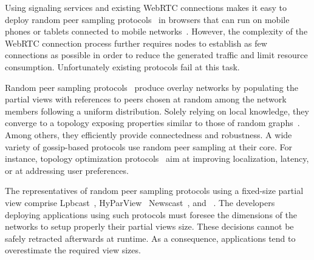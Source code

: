 
Using signaling services and existing WebRTC connections makes it easy
to deploy random peer sampling protocols~\cite{jelasity2004peer} in
browsers that can run on mobile phones or tablets connected to mobile
networks~\cite{Carvajal-Gómez2015}. However, the complexity of the
WebRTC connection process further requires nodes to establish as few
connections as possible in order to reduce the generated traffic and
limit resource consumption. Unfortunately existing protocols fail at
this task.

Random peer sampling protocols~\cite{jelasity2004peer,
  jelasity2007gossip} produce overlay networks by populating the
partial views with references to peers chosen at random among the
network members following a uniform distribution. Solely relying on
local knowledge, they converge to a topology exposing properties
similar to those of random graphs~\cite{erdos1959random}. Among
others, they efficiently provide connectedness and robustness. A wide
variety of gossip-based protocols use random peer sampling at their
core. For instance, topology optimization
protocols~\cite{voulgaris2005epidemic, jelasity2009tman} aim at
improving localization, latency, or at addressing user preferences.

The representatives of random peer sampling protocols using a
fixed-size partial view comprise
Lpbcast~\cite{eugster2003lightweight},
HyParView~\cite{leitao2007hyparview}
Newscast~\cite{tolgyeski2009adaptive}, and
\CYCLON~\cite{voulgaris2005cyclon}. The developers deploying
applications using such protocols must foresee the dimensions of the
networks to setup properly their partial views size. These decisions
cannot be safely retracted afterwards at runtime. As a consequence,
applications tend to overestimate the required view sizes.

